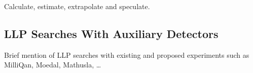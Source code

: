 Calculate, estimate, extrapolate and speculate.

\subsection{LLP Searches With Auxiliary Detectors}
Brief mention of LLP searches with existing and proposed experiments such as MilliQan, Moedal, Mathusla, \ldots